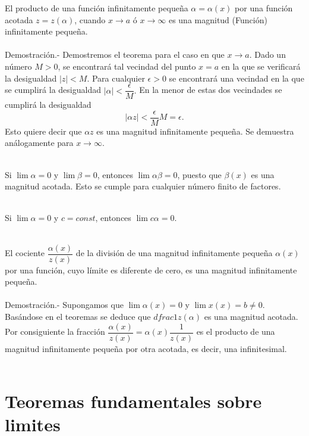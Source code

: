     \begin{teo}
	El producto de una función infinitamente pequeña $\alpha = \alpha(x)$ por una función acotada $z=z(\alpha)$, cuando $x \to a$ ó $x \to \infty$ es una magnitud (Función) infinitamente pequeña.\\\\
	    Demostración.-\; Demostremos el teorema para el caso en que $x \to a$. Dado un número $M>0$, se encontrará tal vecindad del punto $x=a$ en la que se verificará la desigualdad $|z|<M$. Para cualquier $\epsilon > 0$ se encontrará una vecindad en la que se cumplirá la desigualdad $|\alpha|< \dfrac{\epsilon}{M}.$ En la menor de estas dos vecindades se cumplirá la desigualdad $$|\alpha z|< \dfrac{\epsilon}{M}M = \epsilon.$$ Esto quiere decir que $\alpha z$ es una magnitud infinitamente pequeña. Se demuestra análogamente para $x \to \infty$.\\\\
    \end{teo}

	\begin{cor}
	    Si $\lim \alpha = 0$ y $\lim \beta = 0$, entonces $\lim \alpha \beta = 0$, puesto que $\beta (x)$ es una magnitud acotada. Esto se cumple para cualquier número finito de factores.\\\\
	\end{cor}

	\begin{cor}
	    Si $\lim \alpha = 0$ y $c=const$, entonces $\lim c\alpha =0$.\\\\
	\end{cor}

    \begin{teo} El cociente $\dfrac{\alpha(x)}{z(x)}$ de la división de una magnitud infinitamente pequeña $\alpha(x)$ por una función, cuyo límite es diferente de cero, es una magnitud infinitamente pequeña.\\\\
	Demostración.-\; Supongamos que $\lim \alpha(x)=0$ y $\lim x(x)=b\neq 0$. Basándose en el teoremas se deduce que $dfrac{1}{z(\alpha)}$ es una magnitud acotada. Por consiguiente la fracción $\dfrac{\alpha(x)}{z(x)}=\alpha(x)\dfrac{1}{z(x)}$ es el producto de una magnitud infinitamente pequeña por otra acotada, es decir, una infinitesimal.\\\\
    \end{teo}


\section{Teoremas fundamentales sobre limites}
